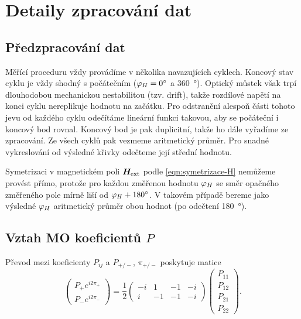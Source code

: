 \section{Detaily zpracování dat}
\label{app:zpracovani}

\subsection*{Předzpracování dat}

Měřící proceduru vždy provádíme v několika navazujících cyklech.
Koncový stav cyklu je vždy shodný s počátečním ($\varphi_H=\SI{0}{\degree}$ a \SI{360}{\degree}).
Optický můstek však trpí dlouhodobou mechanickou nestabilitou (tzv. drift), takže rozdílové napětí na konci cyklu nereplikuje hodnotu na začátku.
Pro odstranění alespoň části tohoto jevu od každého cyklu odečítáme lineární funkci takovou, aby se počáteční i koncový bod rovnal.
Koncový bod je pak duplicitní, takže ho dále vyřadíme ze zpracování.
Ze všech cyklů pak vezmeme aritmetický průměr.
Pro snadné vykreslování od výsledné křivky odečteme její střední hodnotu.

Symetrizaci v magnetickém poli $\bm{H}_\textrm{ext}$ podle \eqref{eqn:symetrizace-H} nemůžeme provést přímo, protože pro každou změřenou hodnotu $\varphi_H$ se směr opačného změřeného pole mírně liší od $\varphi_H+\SI{180}{\degree}$.
V takovém případě bereme jako výsledné $\varphi_H$ aritmetický průměr obou hodnot (po odečtení \SI{180}{\degree}).

\subsection*{Vztah MO koeficientů $P$}

Převod mezi koeficienty $P_{ij}$ a $P_{+/-}$, $\pi_{+/-}$ poskytuje matice
\begin{equation}
    \begin{pmatrix} P_+ e^{i2\pi_+} \\ P_- e^{i2\pi_-} \end{pmatrix}
    = \frac{1}{2}
    \begin{pmatrix} -i & 1 & -1 & -i \\ i & -1 & -1 & -i \end{pmatrix}
    \begin{pmatrix} P_{11}\\P_{12}\\P_{21}\\P_{22} \end{pmatrix}  .
\end{equation}


